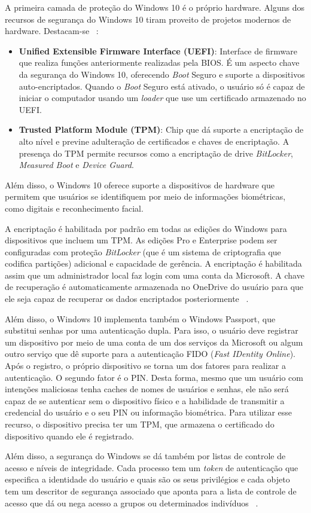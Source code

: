 A primeira camada de proteção do Windows 10 é o próprio hardware. Alguns dos recursos de segurança do Windows 10 tiram proveito de projetos modernos de hardware. Destacam-se ~\cite{introducing_windows}:

\begin{itemize}
\item \textbf{Unified Extensible Firmware Interface (UEFI)}: Interface de firmware que realiza funções anteriormente realizadas pela BIOS. É um aspecto chave da segurança do Windows 10, oferecendo \emph{Boot} Seguro e suporte a dispositivos auto-encriptados. Quando o \emph{Boot} Seguro está ativado, o usuário só é capaz de iniciar o computador usando um \emph{loader} que use um certificado armazenado no UEFI.   
\item \textbf{Trusted Platform Module (TPM)}: Chip que dá suporte a encriptação de alto nível e previne adulteração de certificados e chaves de encriptação. A presença do TPM permite recursos como a encriptação de drive \emph{BitLocker}, \emph{Measured Boot} e \emph{Device Guard}.
\end{itemize}

Além disso, o Windows 10 oferece suporte a dispositivos de hardware que permitem que usuários se identifiquem por meio de informações biométricas, como digitais e reconhecimento facial.

A encriptação é habilitada por padrão em todas as edições do Windows para dispositivos que incluem um TPM. As edições Pro e Enterprise podem ser configuradas com proteção \emph{BitLocker} (que é um sistema de criptografia que codifica partições) adicional e capacidade de gerência. A encriptação é habilitada assim que um administrador local faz login com uma conta da Microsoft. A chave de recuperação é automaticamente armazenada no OneDrive do usuário para que ele seja capaz de recuperar os dados encriptados posteriormente ~\cite{introducing_windows}.

Além disso, o Windows 10 implementa também o Windows Passport, que substitui senhas por uma autenticação dupla. Para isso, o usuário deve registrar um dispositivo por meio de uma conta de um dos serviços da Microsoft ou algum outro serviço que dê suporte para a autenticação FIDO (\emph{Fast IDentity Online}). Após o registro, o próprio dispositivo se torna um dos fatores para realizar a autenticação. O segundo fator é o PIN. Desta forma, mesmo que um usuário com intenções maliciosas tenha caches de nomes de usuários e senhas, ele não será capaz de se autenticar sem o dispositivo físico e a habilidade de transmitir a credencial do usuário e o seu PIN ou informação biométrica. Para utilizar esse recurso, o dispositivo precisa ter um TPM, que armazena o certificado do dispositivo quando ele é registrado.

Além disso, a segurança do Windows se dá também por listas de controle de acesso e níveis de integridade. Cada processo tem um \emph{token} de autenticação que especifica a identidade do usuário e quais são os seus privilégios e cada objeto tem um descritor de segurança associado que aponta para a lista de controle de acesso que dá ou nega acesso a grupos ou determinados indivíduos ~\cite{tanenbaum}. 